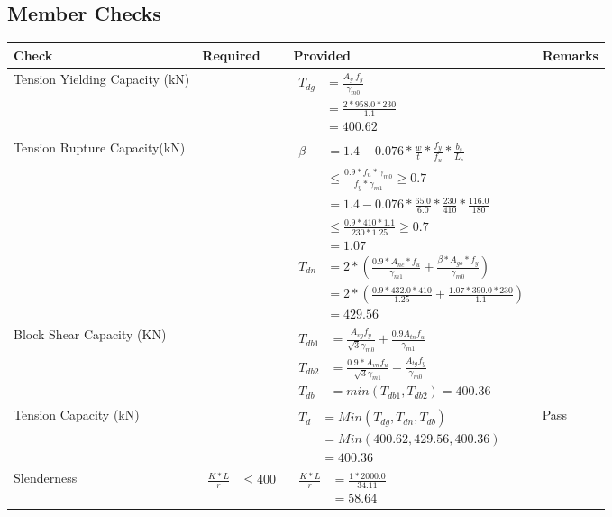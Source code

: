 \documentclass{article}%
\renewcommand{\arraystretch}{1.2}%
\begin{document}
\subsection{Member Checks}%
\label{subsec:MemberChecks}%
\renewcommand{\arraystretch}{1.2}%
\begin{longtable}{|p{3cm}|p{5cm}|p{7cm}|p{1cm}|}%
\hline%
\rowcolor{OsdagGreen}%
Check&Required&Provided&Remarks\\%
\hline%
\endhead%
\hline%
Tension Yielding Capacity (kN)&&$\begin{aligned}T_{dg} &= \frac{A_g ~ f_y}{\gamma_{m0}}\\ &= \frac{2*958.0*230}{1.1}\\ &= 400.62\end{aligned}$&\\%
\hline%
Tension Rupture Capacity(kN)&&$\begin{aligned}\beta &= 1.4 - 0.076*\frac{w}{t}*\frac{f_{y}}{f_{u}}*\frac{b_s}{L_c}\\ &\leq\frac{0.9*f_{u}*\gamma_{m0}}{f_{y}*\gamma_{m1}} \geq 0.7 \\ &= 1.4 - 0.076*\frac{65.0}{6.0}*\frac{230}{410}*\frac{116.0}{180 }\\ &\leq\frac{0.9* 410*1.1}{230*1.25} \geq 0.7 \\ &= 1.07\\ T_{dn} &= 2*(\frac{0.9*A_{nc}*f_{u}}{\gamma_{m1}} + \frac{\beta * A_{go} * f_{y}}{\gamma_{m0}})\\ &= 2*(\frac{0.9* 432.0*410}{1.25} + \frac{1.07*390.0*230}{1.1})\\ &= 429.56\end{aligned}$&\\%
\hline%
Block Shear Capacity (KN)&&$\begin{aligned}T_{db1} &= \frac{A_{vg} f_{y}}{\sqrt{3} \gamma_{m0}} + \frac{0.9 A_{tn} f_{u}}{\gamma_{m1}}\\ T_{db2} &= \frac{0.9*A_{vn} f_{u}}{\sqrt{3} \gamma_{m1}} + \frac{A_{tg} f_{y}}{\gamma_{m0}}\\ T_{db} &= min(T_{db1}, T_{db2})= 400.36\end{aligned}$&\\%
\hline%
Tension Capacity (kN)&&$\begin{aligned} T_d &= Min(T_{dg},T_{dn},T_{db})\\ &= Min(400.62,429.56,400.36)\\ &=400.36\end{aligned}$&Pass\\%
\hline%
Slenderness&$\begin{aligned}\frac{K * L}{r} &\leq 400\end{aligned}$&$\begin{aligned}\frac{K * L}{r} &= \frac{1*2000.0}{34.11}\\ &= 58.64\end{aligned}$&\\%

\end{longtable}
\end{document}
